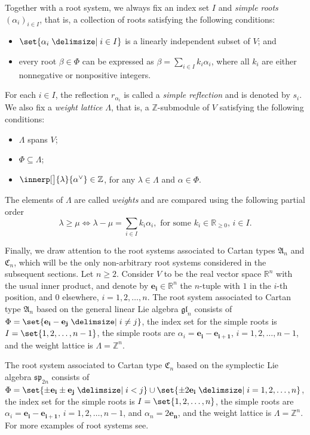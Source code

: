 \documentclass[a4paper,reqno]{amsart}
\numberwithin{equation}{section}
\theoremstyle{plain}
\theoremstyle{definition}
\theoremstyle{remark}
\newcommand*{\dtgterm}[1]{\emph{#1}}  %
\newcommand*{\avoidcitebreak}{\nolinebreak[3] }  %
\newcommand*{\itmform}[1]{\textup{(#1)}}
\newcounter{cstlabeli}
\newcommand*{\cstlabel}[1]{%
  \renewcommand*{\thecstlabeli}{#1}%
  \refstepcounter{cstlabeli}%
}
\newcommand*{\itmcstlabel}[1]{%
  \cstlabel{#1}%
  \itmform{#1}%
}
\newcommand*{\cstitem}[2]{%
  \item[%
    \itmcstlabel{#1}%
    \label{#2}%
  ]%
}
\newcommand*{\Z}{\mathbb{Z}}               %
\newcommand*{\R}{\mathbb{R}}               %
\newcommand*{\setsymbol}[1][]{#1\vert}
\providecommand*{\given}{\relax}
\renewcommand*{\given}{\mathclose{}\mathrel{\setsymbol[\delimsize]}\mathopen{}}%
\renewcommand*{\given}{\mathclose{}\mathrel{\setsymbol[\delimsize]}\mathopen{}}%
\newcommand*{\pressymbol}[1][]{#1\vert}
\renewcommand*{\given}{\mathclose{}\mathrel{\pressymbol[\delimsize]}\mathopen{}}%
\newcommand*{\vc}[1]{\mathbf{#1}}
\newcommand*{\glin}{\mathfrak{gl}}  %
\newcommand*{\symp}{\mathfrak{sp}}  %
\newcommand*{\alphav}{\alpha^{\vee}}
\newcommand*{\tA}{\mathfrak{A}}
\newcommand*{\tC}{\mathfrak{C}}
\newcommand*{\tAn}{\tA_{n}}
\newcommand*{\tCn}{\tC_n}
\begin{document}
Together with a root system, we always fix an index set $I$ and \dtgterm{simple roots} $(\alpha_i)_{i \in I}$, that is, a collection of roots satisfying the following conditions:
\begin{itemize}
\cstitem{SR1}{itm:simplerootsli}
$\set{\alpha_i \given i \in I}$ is a linearly independent subset of $V$; and

\cstitem{SR2}{itm:simplerootsspen}
every root $\beta \in \Phi$ can be expressed as $\beta = \sum_{i \in I} k_i \alpha_i$, where all $k_i$ are either nonnegative or nonpositive integers.
\end{itemize}
For each $i \in I$, the reflection $r_{\alpha_i}$ is called a \dtgterm{simple reflection} and is denoted by $s_i$.
We also fix a \dtgterm{weight lattice} $\Lambda$, that is, a $\Z$-submodule of $V$ satisfying the following conditions:
\begin{itemize}
\cstitem{WL1}{itm:weightlatticespans}
$\Lambda$ spans $V$;

\cstitem{WL2}{itm:weightlatticecontains}
$\Phi \subseteq \Lambda$;

\cstitem{WL3}{itm:weightlatticeint}
$\innerp[\big]{\lambda}{\alphav} \in \Z$, for any $\lambda \in \Lambda$ and $\alpha \in \Phi$.
\end{itemize}
The elements of $\Lambda$ are called \dtgterm{weights} and are compared using the following partial order
\begin{equation}
\lambda \geq \mu \iff \lambda - \mu = \sum_{i \in I} k_i \alpha_i, \text{ for some $k_i \in \R_{\geq 0}$, $i \in I$.}
\label{eq:rswpo}
\end{equation}

Finally, we draw attention to the root systems associated to Cartan types $\tAn$ and $\tCn$, which will be the only non-arbitrary root systems considered in the subsequent sections.
Let $n \geq 2$. Consider $V$ to be the real vector space $\R^n$ with the usual inner product,
and denote by $\vc{e_i} \in \R^n$ the $n$-tuple with $1$ in the $i$-th position, and $0$ elsewhere, $i = 1, 2, \ldots, n$.
The root system associated to Cartan type $\tAn$ based on the general linear Lie algebra $\glin_n$ consists of
$\Phi = \set{ \vc{e_i} - \vc{e_j} \given i \neq j }$,
the index set for the simple roots is $I = \set{1, 2, \ldots, n-1}$,
the simple roots are
$\alpha_i = \vc{e_i} - \vc{e_{i+1}}$, $i=1,2,\ldots,n-1$,
and the weight lattice is $\Lambda = \Z^{n}$.

The root system associated to Cartan type $\tCn$ based on the symplectic Lie algebra $\symp_{2n}$ consists of
$\Phi = \set{ \pm \vc{e_i} \pm \vc{e_j} \given i < j } \cup \set{ \pm 2\vc{e_i} \given i = 1, 2, \ldots, n }$,
the index set for the simple roots is $I = \set{1, 2, \ldots, n}$, the simple roots are
$\alpha_i = \vc{e_i} - \vc{e_{i+1}}$, $i=1,2,\ldots,n-1$, and $\alpha_n = 2\vc{e_n}$,
and the weight lattice is $\Lambda = \Z^{n}$.
For more examples of root systems see\avoidcitebreak \cite[Examples~2.4 to~2.10]{BS17}.
\end{document}
